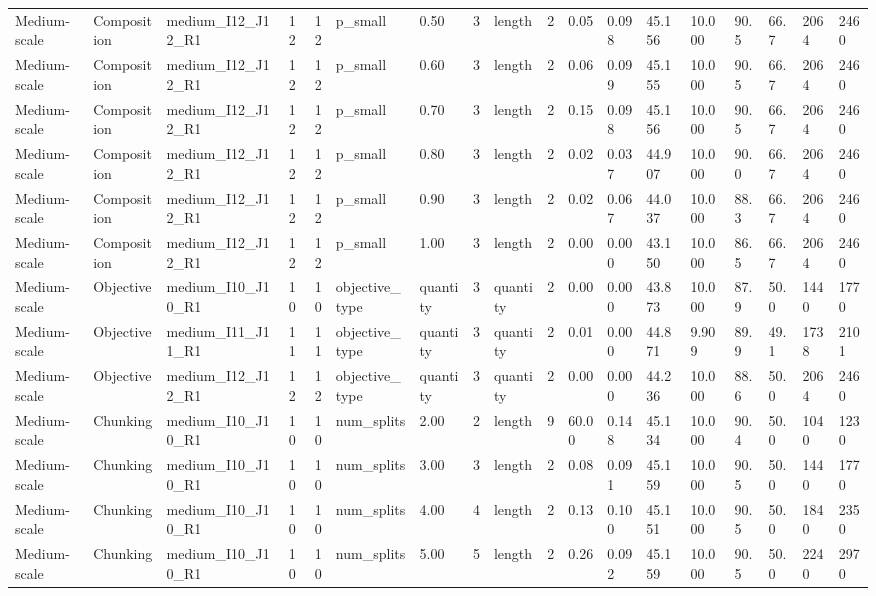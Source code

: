 \begin{longtable}{lllrrllllrllllllll}
Medium-scale & Composition & medium\_I12\_J12\_R1 & 12 & 12 & p\_small & 0.50 & 3 & length & 2 & 0.05 & 0.098 & 45.156 & 10.000 & 90.5 & 66.7 & 2064 & 2460 \\
Medium-scale & Composition & medium\_I12\_J12\_R1 & 12 & 12 & p\_small & 0.60 & 3 & length & 2 & 0.06 & 0.099 & 45.155 & 10.000 & 90.5 & 66.7 & 2064 & 2460 \\
Medium-scale & Composition & medium\_I12\_J12\_R1 & 12 & 12 & p\_small & 0.70 & 3 & length & 2 & 0.15 & 0.098 & 45.156 & 10.000 & 90.5 & 66.7 & 2064 & 2460 \\
Medium-scale & Composition & medium\_I12\_J12\_R1 & 12 & 12 & p\_small & 0.80 & 3 & length & 2 & 0.02 & 0.037 & 44.907 & 10.000 & 90.0 & 66.7 & 2064 & 2460 \\
Medium-scale & Composition & medium\_I12\_J12\_R1 & 12 & 12 & p\_small & 0.90 & 3 & length & 2 & 0.02 & 0.067 & 44.037 & 10.000 & 88.3 & 66.7 & 2064 & 2460 \\
Medium-scale & Composition & medium\_I12\_J12\_R1 & 12 & 12 & p\_small & 1.00 & 3 & length & 2 & 0.00 & 0.000 & 43.150 & 10.000 & 86.5 & 66.7 & 2064 & 2460 \\
Medium-scale & Objective & medium\_I10\_J10\_R1 & 10 & 10 & objective\_type & quantity & 3 & quantity & 2 & 0.00 & 0.000 & 43.873 & 10.000 & 87.9 & 50.0 & 1440 & 1770 \\
Medium-scale & Objective & medium\_I11\_J11\_R1 & 11 & 11 & objective\_type & quantity & 3 & quantity & 2 & 0.01 & 0.000 & 44.871 & 9.909 & 89.9 & 49.1 & 1738 & 2101 \\
Medium-scale & Objective & medium\_I12\_J12\_R1 & 12 & 12 & objective\_type & quantity & 3 & quantity & 2 & 0.00 & 0.000 & 44.236 & 10.000 & 88.6 & 50.0 & 2064 & 2460 \\
Medium-scale & Chunking & medium\_I10\_J10\_R1 & 10 & 10 & num\_splits & 2.00 & 2 & length & 9 & 60.00 & 0.148 & 45.134 & 10.000 & 90.4 & 50.0 & 1040 & 1230 \\
Medium-scale & Chunking & medium\_I10\_J10\_R1 & 10 & 10 & num\_splits & 3.00 & 3 & length & 2 & 0.08 & 0.091 & 45.159 & 10.000 & 90.5 & 50.0 & 1440 & 1770 \\
Medium-scale & Chunking & medium\_I10\_J10\_R1 & 10 & 10 & num\_splits & 4.00 & 4 & length & 2 & 0.13 & 0.100 & 45.151 & 10.000 & 90.5 & 50.0 & 1840 & 2350 \\
Medium-scale & Chunking & medium\_I10\_J10\_R1 & 10 & 10 & num\_splits & 5.00 & 5 & length & 2 & 0.26 & 0.092 & 45.159 & 10.000 & 90.5 & 50.0 & 2240 & 2970 \\

\end{longtable}
